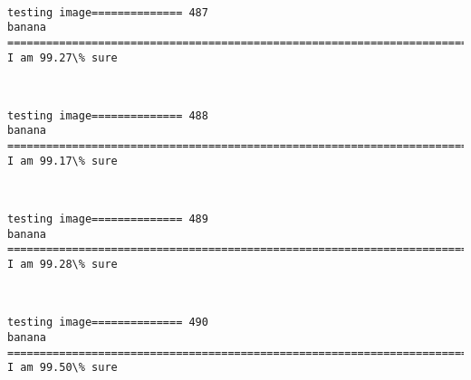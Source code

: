 \documentclass[11pt]{article}
\begin{document}
    \begin{center}
    \end{center}
    { \hspace*{\fill} \\}
    
    \begin{Verbatim}[commandchars=\\\{\}]
testing image============== 487
banana
============================================================================
I am 99.27\% sure

    \end{Verbatim}

    \begin{center}
    \end{center}
    { \hspace*{\fill} \\}
    
    \begin{Verbatim}[commandchars=\\\{\}]
testing image============== 488
banana
============================================================================
I am 99.17\% sure

    \end{Verbatim}

    \begin{center}
    \end{center}
    { \hspace*{\fill} \\}
    
    \begin{Verbatim}[commandchars=\\\{\}]
testing image============== 489
banana
============================================================================
I am 99.28\% sure

    \end{Verbatim}

    \begin{center}
    \end{center}
    { \hspace*{\fill} \\}
    
    \begin{Verbatim}[commandchars=\\\{\}]
testing image============== 490
banana
============================================================================
I am 99.50\% sure

    \end{Verbatim}
\end{document}
